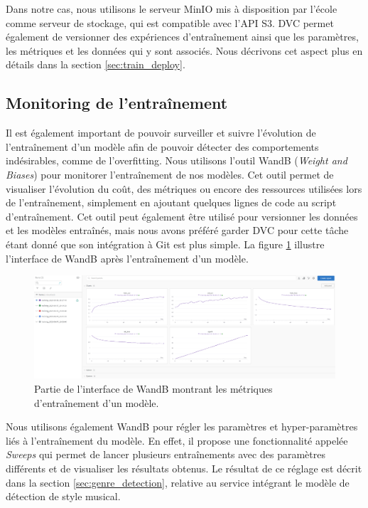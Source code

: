 Dans notre cas, nous utilisons le serveur MinIO mis à disposition par l'école comme serveur de stockage, qui est compatible avec l'API S3. DVC permet également de versionner des expériences d'entraînement ainsi que les paramètres, les métriques et les données qui y sont associés. Nous décrivons cet aspect plus en détails dans la section \ref{sec:train_deploy}.

\subsection{Monitoring de l'entraînement}

Il est également important de pouvoir surveiller et suivre l'évolution de l'entraînement d'un modèle afin de pouvoir détecter des comportements indésirables, comme de l'overfitting. Nous utilisons l'outil WandB (\textit{Weight and Biases}) \cite{wandb} pour monitorer l'entraînement de nos modèles. Cet outil permet de visualiser l'évolution du coût, des métriques ou encore des ressources utilisées lors de l'entraînement, simplement en ajoutant quelques lignes de code au script d'entraînement. Cet outil peut également être utilisé pour versionner les données et les modèles entraînés, mais nous avons préféré garder DVC pour cette tâche étant donné que son intégration à Git est plus simple. La figure \ref{fig:wandb} illustre l'interface de WandB après l'entraînement d'un modèle.

\begin{figure}[H]
    \centering
    \includegraphics[width=\textwidth]{rsc/wandb_interface.png}
    \caption{Partie de l'interface de WandB montrant les métriques d'entraînement d'un modèle.}
    \label{fig:wandb}
\end{figure}

Nous utilisons également WandB pour régler les paramètres et hyper-paramètres liés à l'entraînement du modèle. En effet, il propose une fonctionnalité appelée \textit{Sweeps} qui permet de lancer plusieurs entraînements avec des paramètres différents et de visualiser les résultats obtenus. Le résultat de ce réglage est décrit dans la section \ref{sec:genre_detection}, relative au service intégrant le modèle de détection de style musical.

